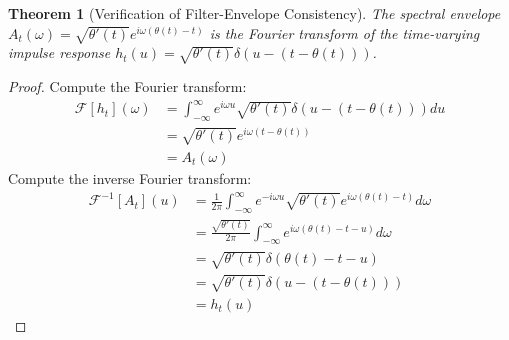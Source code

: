 \documentclass{article}
\newtheorem{theorem}{Theorem}
\begin{document}
\begin{theorem}[Verification of Filter-Envelope Consistency]
The spectral envelope $A_t(\omega) = \sqrt{\theta'(t)} e^{i\omega(\theta(t) - t)}$ is the Fourier transform of the time-varying impulse response $h_t(u) = \sqrt{\theta'(t)} \delta(u - (t - \theta(t)))$.
\end{theorem}

\begin{proof}
Compute the Fourier transform:
\begin{align}
\mathcal{F}[h_t](ω) &= \int_{-\infty}^\infty e^{i\omega u} \sqrt{\theta'(t)} \delta(u - (t - \theta(t))) du \\
&= \sqrt{\theta'(t)} e^{i\omega(t - \theta(t))} \\
&= A_t(\omega)
\end{align}
Compute the inverse Fourier transform:
\begin{align}
\mathcal{F}^{-1}[A_t](u) &= \frac{1}{2\pi} \int_{-\infty}^\infty e^{-i\omega u} \sqrt{\theta'(t)} e^{i\omega(\theta(t) - t)} d\omega \\
&= \frac{\sqrt{\theta'(t)}}{2\pi} \int_{-\infty}^\infty e^{i\omega(\theta(t) - t - u)} d\omega \\
&= \sqrt{\theta'(t)} \delta(\theta(t) - t - u) \\
&= \sqrt{\theta'(t)} \delta(u - (t - \theta(t))) \\
&= h_t(u)
\end{align}
\end{proof}
\end{document}
